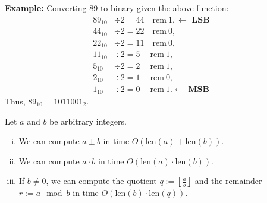 \noindent
\textbf{Example:} Converting 89 to binary given the above function:
\begin{align*}
    89_{10} &\div 2 = 44 \quad \text{rem} \ 1, \longleftarrow \textbf{ LSB}&   \\
    44_{10} &\div 2 = 22 \quad \text{rem} \ 0,& \\
    22_{10} &\div 2 = 11 \quad \text{rem} \ 0,& \\
    11_{10} &\div 2 = 5 \quad \ \text{rem} \ 1,& \\
    5_{10} &\div 2 = 2 \quad \ \text{rem} \ 1,& \\
    2_{10} &\div 2 = 1 \quad \ \text{rem} \ 0,& \\
    1_{10} &\div 2 = 0 \quad \ \text{rem} \ 1.  \longleftarrow \textbf{ MSB} &  
\end{align*}
Thus, $89_{10} = 1011001_2$.

\begin{theo}
    
    \label{theo:basic-arithmetic}

    Let $a$ and $b$ be arbitrary integers.
    \begin{enumerate}[(i)]
        \item We can compute $a \pm b$ in time $O(\text{len}(a) + \text{len}(b))$.
        \item We can compute $a \cdot b$ in time $O(\text{len}(a) \cdot \text{len}(b))$.
        \item If $b \neq 0$, we can compute the quotient $q := \left\lfloor \frac{a}{b} \right\rfloor$ and the remainder $r := a \mod b$ in time $O(\text{len}(b) \cdot \text{len}(q))$.
    \end{enumerate}
\end{theo}


